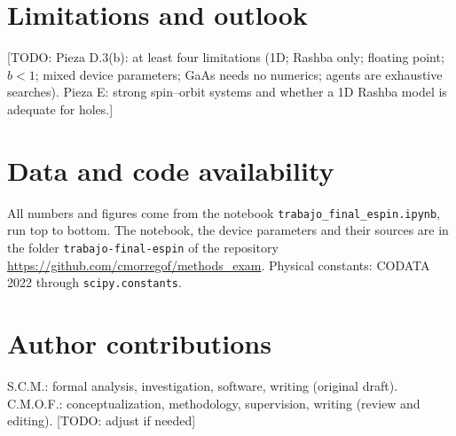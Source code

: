 \documentclass[11pt]{article}
\theoremstyle{remark}
\newcommand{\todo}[1]{\textcolor{red!70!black}{[TODO: #1]}}
\begin{document}
\section{Limitations and outlook}\label{sec:limits}
\todo{Pieza D.3(b): at least four limitations (1D; Rashba only; floating point; $b<1$; mixed device parameters; GaAs needs no numerics; agents are exhaustive searches). Pieza E: strong spin--orbit systems \cite{froning2021} and whether a 1D Rashba model is adequate for holes.}

\section*{Data and code availability}
All numbers and figures come from the notebook \texttt{trabajo\_final\_espin.ipynb}, run top to bottom. The notebook, the device parameters and their sources are in the folder \texttt{trabajo-final-espin} of the repository
\url{https://github.com/cmorregof/methods_exam}. Physical constants: CODATA 2022 through \texttt{scipy.constants}.

\section*{Author contributions}
S.C.M.: formal analysis, investigation, software, writing (original draft). C.M.O.F.: conceptualization, methodology, supervision, writing (review and editing). \todo{adjust if needed}
\end{document}
